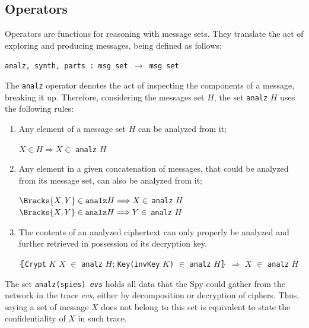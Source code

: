 \subsection{Operators}
Operators are functions for reasoning with message sets. They translate the act of exploring and producing messages, being defined as follows:

\begin{center}
  \texttt{analz, synth, parts : msg set $\longrightarrow$ msg set}
\end{center}

The \texttt{analz} operator denotes the act of inspecting the components of a message, breaking it up. Therefore, considering the messages set $H$, the set \texttt{analz} $H$ uses the following rules:

\begin{enumerate}
  \item Any element of a message set $H$ can be analyzed from it;
  \begin{center}
    $X \in H \Longrightarrow X \in$ \texttt{analz} $H$
  \end{center}

  \item Any element in a given concatenation of messages, that could be analyzed from its message set, can also be analyzed from it;
  \begin{center}
    $\Bracks{X,Y} \in \texttt{analz} H \Longrightarrow X \in$ \texttt{analz} $H$ \\
    $\Bracks{X,Y} \in \texttt{analz} H \Longrightarrow Y \in$ \texttt{analz} $H$
  \end{center}

  \item The contents of an analyzed ciphertext can only properly be analyzed and further retrieved in possession of its decryption key.
  \begin{center}
    $\lBrace$\texttt{Crypt} $K$ $X$ $\in$ \texttt{analz} $H$; \texttt{Key(invKey} $K$\texttt{)} $\in$ \texttt{analz} $H\rBrace$ $\Longrightarrow$ $X$ $\in$ \texttt{analz} $H$
  \end{center}
\end{enumerate}

The set \texttt{analz(spies) \textit{evs}} holds all data that the Spy could gather from the network in the trace \textit{evs}, either by decomposition or decryption of ciphers. Thus, saying a set of message $X$ does not belong to this set is equivalent to state the confidentiality of $X$ in such trace.

